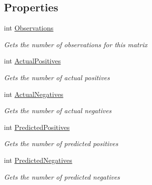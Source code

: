 \subsection*{Properties}
\begin{DoxyCompactItemize}
\item 
int \hyperlink{class_crowdsourcing_project_1_1_statistics_1_1_confusion_matrix_a9f421cb6ea3fab10b50af5c05e663146}{Observations}
\begin{DoxyCompactList}\small\item\em Gets the number of observations for this matrix \end{DoxyCompactList}\item 
int \hyperlink{class_crowdsourcing_project_1_1_statistics_1_1_confusion_matrix_a5e9d3164713343c5fb0b2181247c6629}{Actual\+Positives}
\begin{DoxyCompactList}\small\item\em Gets the number of actual positives \end{DoxyCompactList}\item 
int \hyperlink{class_crowdsourcing_project_1_1_statistics_1_1_confusion_matrix_ac0499cbf491c53f963cef98c734e036e}{Actual\+Negatives}
\begin{DoxyCompactList}\small\item\em Gets the number of actual negatives \end{DoxyCompactList}\item 
int \hyperlink{class_crowdsourcing_project_1_1_statistics_1_1_confusion_matrix_a4e5867d4530373feab1bc0bedbb116c6}{Predicted\+Positives}
\begin{DoxyCompactList}\small\item\em Gets the number of predicted positives \end{DoxyCompactList}\item 
int \hyperlink{class_crowdsourcing_project_1_1_statistics_1_1_confusion_matrix_a3206bbbeb0b665b1b597bd02d21a3b07}{Predicted\+Negatives}
\begin{DoxyCompactList}\small\item\em Gets the number of predicted negatives \end{DoxyCompactList}\item 

\end{DoxyCompactItemize}
